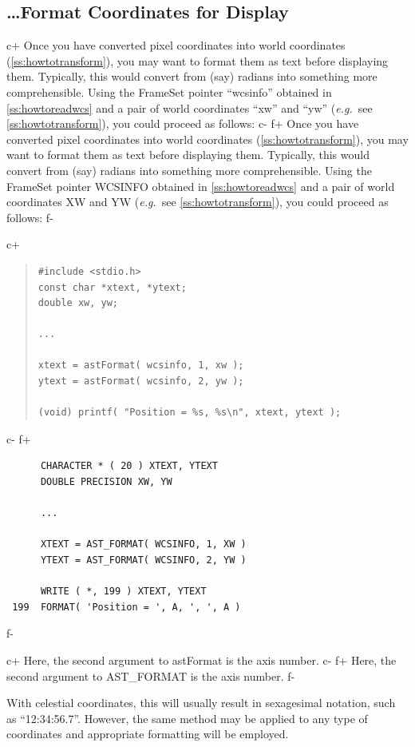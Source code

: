 \documentclass[twoside,11pt]{article}
\newcommand{\secref}[1]{\S\ref{#1}}
\renewcommand{\secref}[1]{\ref{#1}}
\begin{document}
\subsection{\label{ss:howtoformatcoordinates}\ldots Format Coordinates for Display}

c+
Once you have converted pixel coordinates into world coordinates
(\secref{ss:howtotransform}), you may want to format them as text
before displaying them. Typically, this would convert from (say)
radians into something more comprehensible. Using the FrameSet pointer
``wcsinfo'' obtained in \secref{ss:howtoreadwcs} and a pair of world
coordinates ``xw'' and ``yw'' ({\em{e.g.}}\ see
\secref{ss:howtotransform}), you could proceed as follows:
c-
f+
Once you have converted pixel coordinates into world coordinates
(\secref{ss:howtotransform}), you may want to format them as text
before displaying them. Typically, this would convert from (say)
radians into something more comprehensible. Using the FrameSet pointer
WCSINFO obtained in \secref{ss:howtoreadwcs} and a pair of world
coordinates XW and YW ({\em{e.g.}}\ see \secref{ss:howtotransform}),
you could proceed as follows:
f-

c+
\begin{quote}
\small
\begin{verbatim}
#include <stdio.h>
const char *xtext, *ytext;
double xw, yw;

...

xtext = astFormat( wcsinfo, 1, xw );
ytext = astFormat( wcsinfo, 2, yw );

(void) printf( "Position = %s, %s\n", xtext, ytext );
\end{verbatim}
\normalsize
\end{quote}
c-
f+
\small
\begin{verbatim}
      CHARACTER * ( 20 ) XTEXT, YTEXT
      DOUBLE PRECISION XW, YW

      ...

      XTEXT = AST_FORMAT( WCSINFO, 1, XW )
      YTEXT = AST_FORMAT( WCSINFO, 2, YW )

      WRITE ( *, 199 ) XTEXT, YTEXT
 199  FORMAT( 'Position = ', A, ', ', A )
\end{verbatim}
\normalsize
f-

c+
Here, the second argument to astFormat is the axis number.
c-
f+
Here, the second argument to AST\_FORMAT is the axis number.
f-

With celestial coordinates, this will usually result in sexagesimal
notation, such as ``12:34:56.7''. However, the same method may be
applied to any type of coordinates and appropriate formatting will be
employed.
\end{document}

